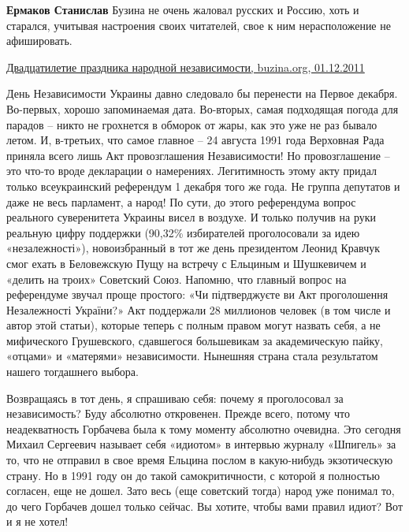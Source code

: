 \begin{itemize}
\begin{itemize}
\textbf{Ермаков Станислав} Бузина не очень жаловал русских и Россию, хоть и старался, учитывая настроения своих читателей, свое к ним нерасположение не афишировать.

\href{https://buzina.org/politics/658-dvatsatiletuye-prazdnika-narodnoy-nezavisimosti.html}{%
Двадцатилетие праздника народной независимости, buzina.org, 01.12.2011%
}

\begin{multicols}{2} %
День Независимости Украины давно следовало бы перенести на Первое декабря.
Во-первых, хорошо запоминаемая дата. Во-вторых, самая подходящая погода для
парадов – никто не грохнется в обморок от жары, как это уже не раз бывало
летом. И, в-третьих, что самое главное – 24 августа 1991 года Верховная Рада
приняла всего лишь Акт провозглашения Независимости! Но провозглашение – это
что-то вроде декларации о намерениях. Легитимность этому акту придал только
всеукраинский референдум 1 декабря того же года. Не группа депутатов и даже не
весь парламент, а народ! По сути, до этого референдума вопрос реального
суверенитета Украины висел в воздухе. И только получив на руки реальную цифру
поддержки (90,32\% избирателей проголосовали за идею «незалежності»),
новоизбранный в тот же день президентом Леонид Кравчук смог ехать в Беловежскую
Пущу на встречу с Ельциным и Шушкевичем и «делить на троих» Советский Союз.
Напомню, что главный вопрос на референдуме звучал проще простого: «Чи
підтверджуєте ви Акт проголошення Незалежності України?» Акт поддержали 28
миллионов человек (в том числе и автор этой статьи), которые теперь с полным
правом могут назвать себя, а не мифического Грушевского, сдавшегося большевикам
за академическую пайку, «отцами» и «матерями» независимости. Нынешняя страна
стала результатом нашего тогдашнего выбора.

Возвращаясь в тот день, я спрашиваю себя: почему я проголосовал за
независимость? Буду абсолютно откровенен. Прежде всего, потому что
неадекватность Горбачева была к тому моменту абсолютно очевидна. Это сегодня
Михаил Сергеевич называет себя «идиотом» в интервью журналу «Шпигель» за то,
что не отправил в свое время Ельцина послом в какую-нибудь экзотическую страну.
Но в 1991 году он до такой самокритичности, с которой я полностью согласен, еще
не дошел. Зато весь (еще советский тогда) народ уже понимал то, до чего
Горбачев дошел только сейчас. Вы хотите, чтобы вами правил идиот? Вот и я не
хотел!


\end{multicols}
\end{itemize}
\end{itemize}
